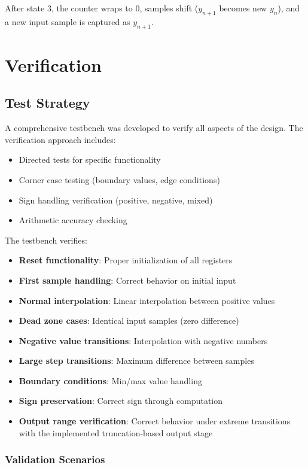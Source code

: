 \documentclass[a4paper,11pt]{article}
\begin{document}
After state 3, the counter wraps to 0, samples shift ($y_{n+1}$ becomes new $y_n$), and a new input sample is captured as $y_{n+1}$.

\newpage
\section{Verification}

\subsection{Test Strategy}

A comprehensive testbench was developed to verify all aspects of the design. The verification approach includes:
\begin{itemize}
    \item Directed tests for specific functionality
    \item Corner case testing (boundary values, edge conditions)
    \item Sign handling verification (positive, negative, mixed)
    \item Arithmetic accuracy checking
\end{itemize}

The testbench verifies:
\begin{itemize}
    \item \textbf{Reset functionality}: Proper initialization of all registers
    \item \textbf{First sample handling}: Correct behavior on initial input
    \item \textbf{Normal interpolation}: Linear interpolation between positive values
    \item \textbf{Dead zone cases}: Identical input samples (zero difference)
    \item \textbf{Negative value transitions}: Interpolation with negative numbers
    \item \textbf{Large step transitions}: Maximum difference between samples
    \item \textbf{Boundary conditions}: Min/max value handling
    \item \textbf{Sign preservation}: Correct sign through computation
    \item \textbf{Output range verification}: Correct behavior under extreme transitions with the implemented truncation-based output stage
\end{itemize}

\subsubsection{Validation Scenarios}
\end{document}

